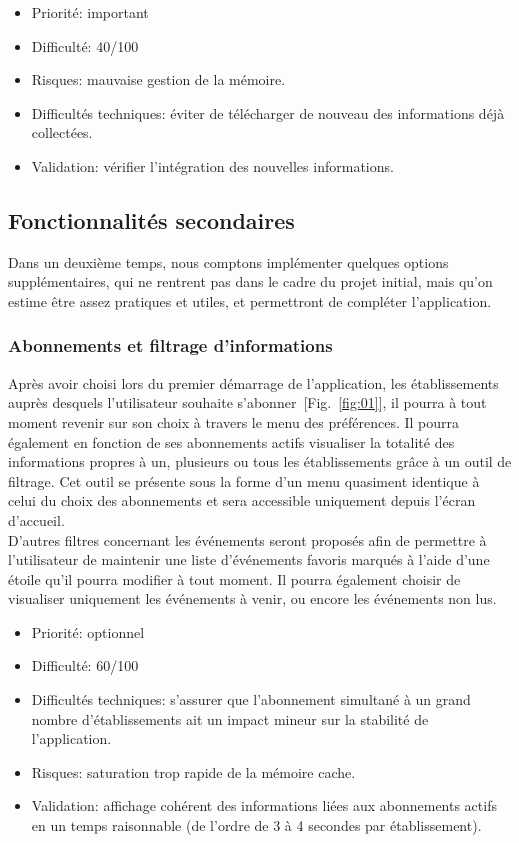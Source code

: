\begin{itemize}
\renewcommand{\labelitemi}{$\bullet$}
\item Priorité: important
\item Difficulté: 40/100
\item Risques: mauvaise gestion de la mémoire.
\item Difficultés techniques: éviter de télécharger de nouveau des informations déjà collectées.
\item Validation: vérifier l'intégration des nouvelles informations.
\end{itemize}


\subsection{Fonctionnalités secondaires}
Dans un deuxième temps, nous comptons implémenter quelques options supplémentaires, qui ne rentrent pas dans le cadre du projet initial, mais qu'on estime être assez pratiques et utiles, et permettront de compléter l'application.

\subsubsection{Abonnements et filtrage d'informations}
Après avoir choisi lors du premier démarrage de l'application, les établissements auprès desquels l'utilisateur souhaite s'abonner~[Fig.~\ref{fig:01}], il pourra à tout moment revenir sur son choix à travers le menu des préférences.
Il pourra également en fonction de ses abonnements actifs visualiser la totalité des informations propres à un, plusieurs ou tous les établissements grâce à un outil de filtrage. Cet outil se présente sous la forme d'un menu quasiment identique à celui du choix des abonnements et sera accessible uniquement depuis l'écran d'accueil. \\
D'autres filtres concernant les événements seront proposés afin de permettre à l'utilisateur de maintenir une liste d'événements favoris marqués à l'aide d'une étoile qu'il pourra modifier à tout moment. Il pourra également choisir de visualiser uniquement les événements à venir, ou encore les événements non lus. \\

\begin{itemize}
\renewcommand{\labelitemi}{$\bullet$}
\item Priorité: optionnel
\item Difficulté: 60/100
\item Difficultés techniques: s'assurer que l'abonnement simultané à un grand nombre d'établissements ait un impact mineur sur la stabilité de l'application.
\item Risques: saturation trop rapide de la mémoire cache.
\item Validation: affichage cohérent des informations liées aux abonnements actifs en un temps raisonnable (de l'ordre de 3 à 4 secondes par établissement).
\end{itemize}

